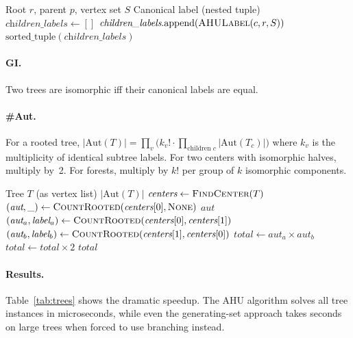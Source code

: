 \documentclass[twoside]{article}
\begin{document}
\begin{algorithm}[H]
\caption{AHU Canonical Label}\label{alg:ahu_label}
\begin{algorithmic}[1]
\Require Root $r$, parent $p$, vertex set $S$
\Ensure Canonical label (nested tuple)
\State $\textit{children\_labels} \gets []$
    \State $\textit{children\_labels}.\text{append}(\Call{AHULabel}{c, r, S})$
\EndFor
\State \Return $\text{sorted\_tuple}(\textit{children\_labels})$
\end{algorithmic}
\end{algorithm}

\paragraph{GI.} Two trees are isomorphic iff their canonical labels are equal.

\paragraph{\#Aut.} For a rooted tree, $|\text{Aut}(T)| = \prod_v \bigl( k_v! \cdot \prod_{\text{children } c} |\text{Aut}(T_c)| \bigr)$ where $k_v$ is the multiplicity of identical subtree labels. For two centers with isomorphic halves, multiply by~2. For forests, multiply by $k!$ per group of $k$ isomorphic components.

\begin{algorithm}[H]
\caption{Tree Automorphism Count}\label{alg:tree_aut}
\begin{algorithmic}[1]
\Require Tree $T$ (as vertex list)
\Ensure $|\text{Aut}(T)|$
\State $\textit{centers} \gets \Call{FindCenter}{T}$
    \State $(\textit{aut}, \_) \gets \Call{CountRooted}{\textit{centers}[0], \textsc{None}}$
    \State \Return $\textit{aut}$
\Else
    \State $(\textit{aut}_a, \textit{label}_a) \gets \Call{CountRooted}{\textit{centers}[0], \textit{centers}[1]}$
    \State $(\textit{aut}_b, \textit{label}_b) \gets \Call{CountRooted}{\textit{centers}[1], \textit{centers}[0]}$
    \State $\textit{total} \gets \textit{aut}_a \times \textit{aut}_b$
        \State $\textit{total} \gets \textit{total} \times 2$ 
    \EndIf
    \State \Return $\textit{total}$
\EndIf
\end{algorithmic}
\end{algorithm}

\paragraph{Results.}
Table~\ref{tab:trees} shows the dramatic speedup. The AHU algorithm solves all tree instances in microseconds, while even the generating-set approach takes seconds on large trees when forced to use branching instead.
\end{document}
